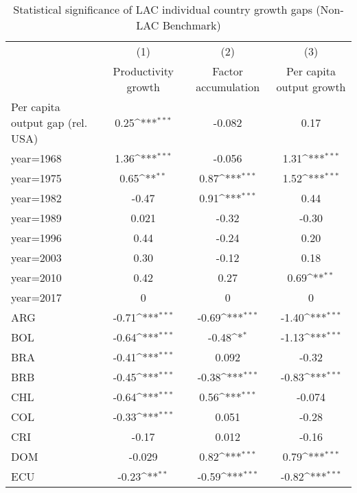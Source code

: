 \begin{table}[htbp]\centering
\def\sym#1{\ifmmode^{#1}\else\(^{#1}\)\fi}
\caption{Statistical significance of LAC individual country growth gaps (Non-LAC Benchmark)}
\begin{tabular}{l*{3}{c}}
\toprule
                &\multicolumn{1}{c}{(1)}&\multicolumn{1}{c}{(2)}&\multicolumn{1}{c}{(3)}\\
                &\multicolumn{1}{c}{Productivity growth}&\multicolumn{1}{c}{Factor accumulation}&\multicolumn{1}{c}{Per capita output growth}\\
\midrule
Per capita output gap (rel. USA)&     0.25\sym{***}&   -0.082         &     0.17         \\
year=1968       &     1.36\sym{***}&   -0.056         &     1.31\sym{***}\\
year=1975       &     0.65\sym{**} &     0.87\sym{***}&     1.52\sym{***}\\
year=1982       &    -0.47         &     0.91\sym{***}&     0.44         \\
year=1989       &    0.021         &    -0.32         &    -0.30         \\
year=1996       &     0.44         &    -0.24         &     0.20         \\
year=2003       &     0.30         &    -0.12         &     0.18         \\
year=2010       &     0.42         &     0.27         &     0.69\sym{**} \\
year=2017       &        0         &        0         &        0         \\
ARG             &    -0.71\sym{***}&    -0.69\sym{***}&    -1.40\sym{***}\\
BOL             &    -0.64\sym{***}&    -0.48\sym{*}  &    -1.13\sym{***}\\
BRA             &    -0.41\sym{***}&    0.092         &    -0.32         \\
BRB             &    -0.45\sym{***}&    -0.38\sym{***}&    -0.83\sym{***}\\
CHL             &    -0.64\sym{***}&     0.56\sym{***}&   -0.074         \\
COL             &    -0.33\sym{***}&    0.051         &    -0.28         \\
CRI             &    -0.17         &    0.012         &    -0.16         \\
DOM             &   -0.029         &     0.82\sym{***}&     0.79\sym{***}\\
ECU             &    -0.23\sym{**} &    -0.59\sym{***}&    -0.82\sym{***}\\

\end{tabular}
\end{table}
